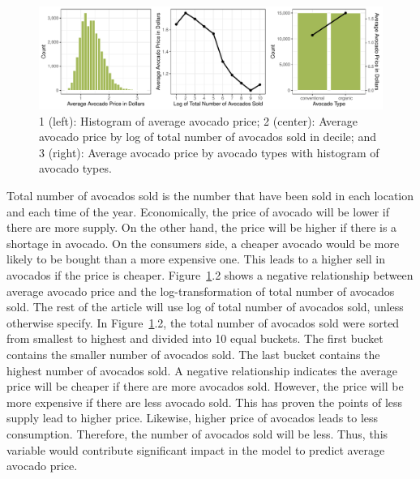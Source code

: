 \documentclass[11pt]{article}\usepackage[]{graphicx}\usepackage[]{color}
\makeatletter
\def\maxwidth{ %
  \ifdim\Gin@nat@width>\linewidth
    \linewidth
  \else
    \Gin@nat@width
  \fi
}
\makeatother
\begin{document}
\begin{figure}[h!] 
\begin{center}

\includegraphics[width=\maxwidth]{figure/unnamed-chunk-1-1} 

\caption{1 (left): Histogram of average avocado price; 2 (center): Average avocado price by log of total number of avocados sold in decile; and 3 (right): Average avocado price by avocado types with histogram of avocado types.}
\label{explore1}
\end{center} 
\end{figure}

\noindent Total number of avocados sold is the number that have been sold in each location and each time of the year. Economically, the price of avocado will be lower if there are more supply. On the other hand, the price will be higher if there is a shortage in avocado. On the consumers side, a cheaper avocado would be more likely to be bought than a more expensive one. This leads to a higher sell in avocados if the price is cheaper. Figure~\ref{explore1}.2 shows a negative relationship between average avocado price and the log-transformation of total number of avocados sold. The rest of the article will use log of total number of avocados sold, unless otherwise specify. In Figure~\ref{explore1}.2, the total number of avocados sold were sorted from smallest to highest and divided into 10 equal buckets. The first bucket contains the smaller number of avocados sold. The last bucket contains the highest number of avocados sold. A negative relationship indicates the average price will be cheaper if there are more avocados sold. However, the price will be more expensive if there are less avocado sold. This has proven the points of less supply lead to higher price. Likewise, higher price of avocados leads to less consumption. Therefore, the number of avocados sold will be less. Thus, this variable would contribute significant impact in the model to predict average avocado price.  
\hfill \break
\end{document}
